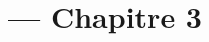 
\title{\TSwiftTitle{} --- Chapitre 3}

\newcommand{\TSwiftRoot}[0]{../..} %



\maketitle

\tableofcontents




